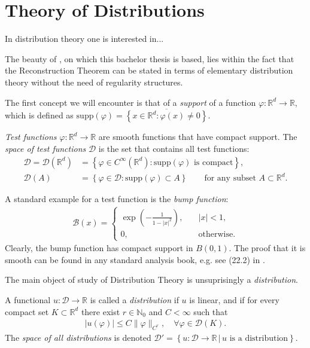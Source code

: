 \section{Theory of Distributions}\label{chapter:distributions}


In distribution theory one is interested in... 

The beauty of \cite{caravenna2021hairer}, on which this bachelor thesis is based, lies within the fact that the Reconstruction Theorem can be stated in terms of elementary distribution theory without the need of regularity structures. 

The first concept we will encounter is that of a \emph{support} of a function $\varphi: \mathbb{R}^d \to \mathbb{R}$, which is defined as $\mathrm{supp}(\varphi) = \overline{\left\{ x \in \mathbb{R}^d : \varphi(x) \neq 0 \right\}}$. 

\begin{definition}
    \emph{Test functions} $\varphi: \mathbb{R}^d \to \mathbb{R}$ are smooth functions that have compact support. The \emph{space of test functions} $\mathcal{D}$ is the set that contains all test functions:
    \begin{align*}
        \mathcal{D} = \mathcal{D}(\mathbb{R}^d) &= \left\{ \varphi \in C^\infty(\mathbb{R}^d) : \text{$\mathrm{supp}(\varphi)$ is compact} \right\}, \\
        \mathcal{D}(A) &= \left\{ \varphi \in \mathcal{D} : \mathrm{supp}(\varphi) \subset A \right\} \qquad \text{for any subset $A \subset \mathbb{R}^d$.}
    \end{align*}
\end{definition}

A standard example for a test function is the \emph{bump function}:
\begin{align*}
    \mathcal{B}(x) = \begin{cases}
        \exp{\left( -\frac{1}{1 - |x|^2} \right)}, \quad & |x| < 1, \\
        0, & \text{otherwise}.
    \end{cases}
\end{align*}
Clearly, the bump function has compact support in $B(0,1)$. The proof that it is smooth can be found in any standard analysis book, e.g. see (22.2) in \cite{Forster_2016}.

The main object of study of Distribution Theory is unsuprisingly a \emph{distribution}.
\begin{definition}[Distribution]
A functional $u: \mathcal{D} \to \mathbb{R}$ is called a \emph{distribution} if $u$ is linear, and if for every compact set $K \subset \mathbb{R}^d$ there exist $r \in \mathbb{N}_0$ and $C < \infty$ such that 
\begin{align*}
    |u(\varphi)| \leq C \lVert\varphi\rVert_{C^r}, \quad \forall \varphi \in \mathcal{D}(K).
\end{align*}
The \emph{space of all distributions} is denoted $\mathcal{D}' = \left\{ u: \mathcal{D} \to \mathbb{R} \, | \, \text{$u$ is a distribution} \right\}$.
\end{definition}

